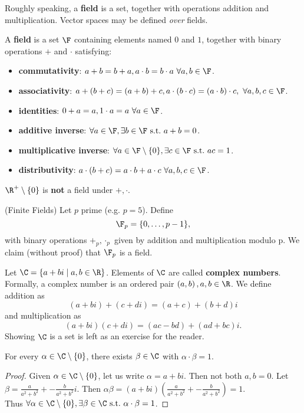 \documentclass[math0540-lecture-notes.tex]{subfiles}
\begin{document}
Roughly speaking, a \textbf{field} is a set, together with operations addition and multiplication.
Vector spaces may be defined \textit{over} fields.
\begin{definition}[Fields]{}
  A \textbf{field} is a set $\F$ containing elements named $0$ and $1$, together with binary
  operations  $+$ and $\cdot $ satisfying:
  \begin{itemize}
    \item \textbf{commutativity}: $a+b=b+a, a\cdot b=b\cdot a~\forall a,b\in \F$.
    \item \textbf{associativity}: $a+(b+c)=(a+b)+c, a\cdot \left( b\cdot c \right) =\left( a\cdot b
      \right) \cdot c, ~\forall a,b,c\in \F$.
    \item \textbf{identities}: $0+a=a, 1\cdot a=a~\forall a\in \F$.
    \item \textbf{additive inverse}: $\forall a\in \F, \exists b\in \F~\text{s.t.}~a+b=0$.
    \item \textbf{multiplicative inverse}: $\forall a\in \F\setminus \{ 0 \}, \exists c\in
      \F~\text{s.t.}~ac=1$.
    \item \textbf{distributivity}: $a\cdot (b+c) = a\cdot b+a\cdot c~\forall a,b,c\in \F$.
  \end{itemize}
\end{definition}
\begin{example}
  $\R^{+}\setminus \{ 0 \}$ is \textbf{not} a field under $+,\cdot $.
\end{example}

\begin{example}
  (Finite Fields) Let $p$ prime (e.g. $p=5$). Define \[
      \F_p = \{0,\ldots,p-1\} 
  ,\] with binary operations $+_p,\cdot_p $ given by addition and multiplication modulo p. We claim
  (without proof) that $\F_p$ is a field.
\end{example}

\begin{example}
  Let $\C=\{a+bi\mid a,b\in \R\} $. Elements of $\C$ are called \textbf{complex numbers}. Formally,
  a complex number is an ordered pair $\left( a,b \right),a,b\in \R$. We define addition as \[
    (a+bi)+(c+di) = (a+c)+(b+d)i
  \] and multiplication as \[
  (a+bi)(c+di) = (ac-bd)+(ad+bc)i
  .\] 
  Showing $ \C$ is a set is left as an exercise for the reader.
\end{example}
\begin{proposition}{}
  For every $\alpha\in \C\setminus \{ 0 \}$, there exists $\beta\in \C$ with $\alpha\cdot \beta=1$.
\end{proposition}
\begin{proof}[Proof]
  Given $\alpha\in \C\setminus \{ 0 \}$, let us write $ \alpha=a+bi$. Then not both $a,b=0$. Let
  $\beta=\frac{a}{a^2+b^2}+-\frac{b}{a^2+b^2}i$. Then $\alpha\beta=(a+bi)\left( \frac{a}{a^2+b^2}
  +-\frac{b}{a^2+b^2}\right) =1$. \\
  Thus $\forall \alpha\in \C\setminus \{ 0 \}, \exists \beta\in \C ~\text{s.t.}~\alpha\cdot \beta=1$.
\end{proof}
\end{document}
